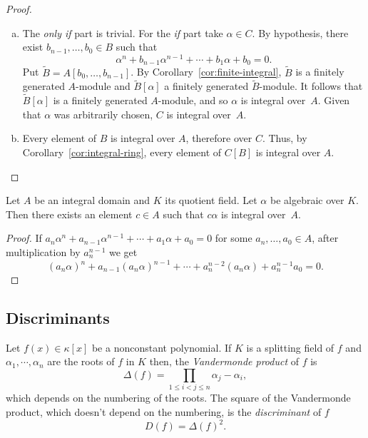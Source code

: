 \begin{proof}${}$
    \begin{enumerate}[a), font=\upshape]
        \item The \textit{only if\/} part is trivial. For the \textit{if\/} part take $\alpha\in C$. By hypothesis, there exist $b_{n-1},\dots,b_0\in B$ such that
        $$
            \alpha^n+b_{n-1}\alpha^{n-1}+\cdots+b_1\alpha
                + b_0=0.
        $$
        Put $\tilde B=A[b_0,\dots,b_{n-1}]$. By Corollary~\ref{cor:finite-integral}, $\tilde B$ is a finitely generated $A$-module and $\tilde B[\alpha]$ a finitely generated $\tilde B$-module. It follows that $\tilde B[\alpha]$ is a finitely generated $A$-module, and so $\alpha$ is integral over~$A$. Given that $\alpha$ was arbitrarily chosen, $C$ is integral over~$A$.

        \item Every element of $B$ is integral over $A$, therefore over $C$. Thus, by Corollary~\ref{cor:integral-ring}, every element of $C[B]$ is integral over $A$.
    \end{enumerate}
\end{proof}

\begin{prop}
    Let\/ $A$ be an integral domain and\/ $K$ its quotient field. Let\/ $\alpha$ be algebraic over\/ $K$. Then there exists an element\/ $c\in A$ such that\/ $c\alpha$ is integral over\/~$A$.
\end{prop}

\begin{proof}
    If $a_n\alpha^n + a_{n-1}\alpha^{n-1} + \cdots + a_1\alpha + a_0 = 0$ for some $a_n,\dots,a_0\in A$, after multiplication by $a_n^{n-1}$ we get 
    $$
        (a_n\alpha)^n + a_{n-1}(a_n\alpha)^{n-1}
            + \cdots + a_n^{n-2}(a_n\alpha)+ a_n^{n-1}a_0
            = 0.
    $$
\end{proof}

\subsection{Discriminants}

\begin{defn}
    Let $f(x)\in\kappa[x]$ be a nonconstant polynomial. If $K$ is a splitting field of $f$ and $\alpha_1,\cdots,\alpha_n$ are the roots of $f$ in $K$ then, the \textsl{Vandermonde product} of $f$ is
    $$
        \Delta(f)=\prod_{1\le i<j\le n}\alpha_j-\alpha_i,
    $$
    which depends on the numbering of the roots. The square of the Vandermonde product, which doesn't depend on the numbering, is the \textsl{discriminant} of $f$
    $$
        D(f)=\Delta(f)^2.
    $$
\end{defn}

